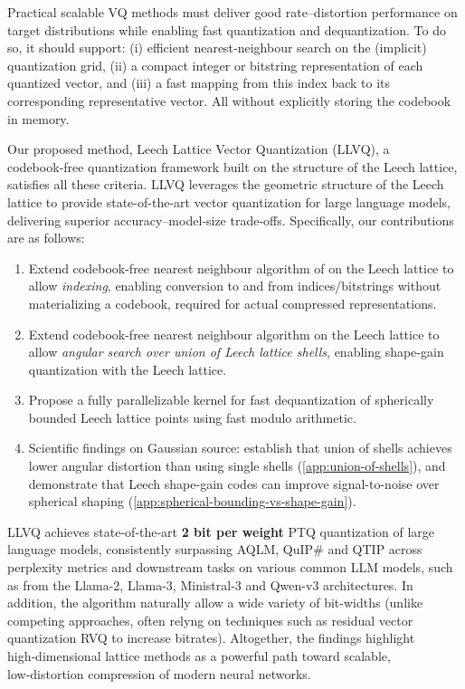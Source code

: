 \documentclass{article}
\theoremstyle{plain}
\theoremstyle{definition}
\theoremstyle{remark}
\begin{document}
Practical scalable VQ methods must deliver good rate–distortion performance on target distributions while enabling fast quantization and dequantization. To do so, it should support: (i) efficient nearest‑neighbour search on the (implicit) quantization grid, (ii) a compact integer or bitstring representation of each quantized vector, and (iii) a fast mapping from this index back to its corresponding representative vector. All without explicitly storing the codebook in memory.

Our proposed method, Leech Lattice Vector Quantization (LLVQ), a codebook‑free quantization framework built on the structure of the Leech lattice, satisfies all these criteria. LLVQ leverages the geometric structure of the Leech lattice to provide state-of-the-art vector quantization for large language models, delivering superior accuracy–model‑size trade-offs. Specifically, our contributions are as follows:
\begin{enumerate}
    \vspace{-0.6em}
    \item Extend codebook-free nearest neighbour algorithm of \citet{adoul1988nearest} on the Leech lattice to allow \textit{indexing}, enabling conversion to and from indices/bitstrings without materializing a codebook, required for actual compressed representations.
    \vspace{-0.6em}
    \item Extend codebook-free nearest neighbour algorithm on the Leech lattice to allow \textit{angular search over union of Leech lattice shells}, enabling shape-gain quantization with the Leech lattice.
    \vspace{-0.6em}
    \item Propose a fully parallelizable kernel for fast dequantization of spherically bounded Leech lattice points using fast modulo arithmetic.
    \vspace{-0.6em}
    \item Scientific findings on Gaussian source: establish that union of shells achieves lower angular distortion than using single shells (\autoref{app:union-of-shells}), and demonstrate that Leech shape-gain codes can improve signal-to-noise over spherical shaping (\autoref{app:spherical-bounding-vs-shape-gain}).
\end{enumerate}
LLVQ achieves state‑of‑the‑art \textbf{2 bit per weight} PTQ quantization of large language models, consistently surpassing AQLM, QuIP\# and QTIP across perplexity metrics and downstream tasks on various common LLM models, such as from the Llama-2, Llama-3, Ministral-3 and Qwen-v3 architectures. In addition, the algorithm naturally allow a wide variety of bit-widths (unlike competing approaches, often relyng on techniques such as residual vector quantization RVQ \citep{tseng2024quip} to increase bitrates). Altogether, the findings highlight high‑dimensional lattice methods as a powerful path toward scalable, low‑distortion compression of modern neural networks.
\end{document}
